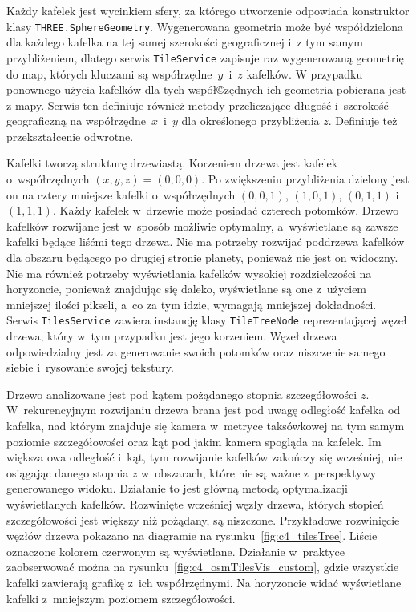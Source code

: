 Każdy kafelek jest wycinkiem sfery, za którego utworzenie odpowiada konstruktor klasy \texttt{THREE.SphereGeometry}. Wygenerowana geometria może być współdzielona dla każdego kafelka na tej samej szerokości geograficznej i~z tym samym przybliżeniem, dlatego serwis \texttt{TileService} zapisuje raz wygenerowaną geometrię do map, których kluczami są współrzędne~$y$~i~$z$ kafelków. W przypadku ponownego użycia kafelków dla tych współ©zędnych ich geometria pobierana jest z mapy. Serwis ten definiuje również metody przeliczające długość i~szerokość geograficzną na współrzędne~$x$~i~$y$ dla określonego przybliżenia $z$. Definiuje też przekształcenie odwrotne.

Kafelki tworzą strukturę drzewiastą. Korzeniem drzewa jest kafelek o~współrzędnych $(x, y, z) = (0,0,0)$. Po zwiększeniu przybliżenia dzielony jest on na cztery mniejsze kafelki o~współrzędnych $(0,0,1)$, $(1,0,1)$, $(0,1,1)$ i~$(1,1,1)$. Każdy kafelek w~drzewie może posiadać czterech potomków. Drzewo kafelków rozwijane jest w~sposób możliwie optymalny, a~wyświetlane są zawsze kafelki będące liśćmi tego drzewa. Nie ma potrzeby rozwijać poddrzewa kafelków dla obszaru będącego po drugiej stronie planety, ponieważ nie jest on widoczny. Nie ma również potrzeby wyświetlania kafelków wysokiej rozdzielczości na horyzoncie, ponieważ znajdując się daleko, wyświetlane są one z~użyciem mniejszej ilości pikseli, a~co za tym idzie, wymagają mniejszej dokładności. Serwis \texttt{TilesService} zawiera instancję klasy \texttt{TileTreeNode} reprezentującej węzeł drzewa, który w~tym przypadku jest jego korzeniem. Węzeł drzewa odpowiedzialny jest za generowanie swoich potomków oraz niszczenie samego siebie i~rysowanie swojej tekstury.

Drzewo analizowane jest pod kątem pożądanego stopnia szczegółowości $z$. W~rekurencyjnym rozwijaniu drzewa brana jest pod uwagę odległość kafelka od kafelka, nad którym znajduje się kamera w~metryce taksówkowej na tym samym poziomie szczegółowości oraz kąt pod jakim kamera spogląda na kafelek. Im większa owa odległość i~kąt, tym rozwijanie kafelków zakończy się wcześniej, nie osiągając danego stopnia $z$ w~obszarach, które nie są ważne z~perspektywy generowanego widoku. Działanie to jest główną metodą optymalizacji wyświetlanych kafelków. Rozwinięte wcześniej węzły drzewa, których stopień szczegółowości jest większy niż pożądany, są niszczone. Przykładowe rozwinięcie węzłów drzewa pokazano na diagramie na rysunku~\ref{fig:c4_tilesTree}. Liście oznaczone kolorem czerwonym są wyświetlane. Działanie w~praktyce zaobserwować można na rysunku~\ref{fig:c4_osmTilesVis_custom}, gdzie wszystkie kafelki zawierają grafikę z~ich współrzędnymi. Na horyzoncie widać wyświetlane kafelki z~mniejszym poziomem szczegółowości. 

